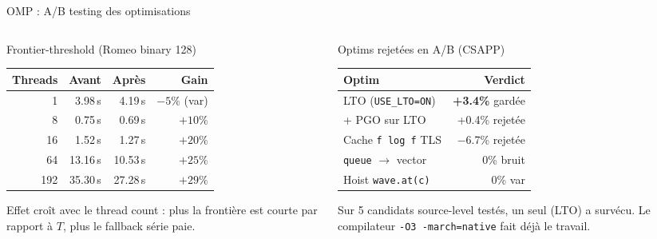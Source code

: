 \documentclass[aspectratio=169,11pt]{beamer}
\begin{document}
\begin{frame}{OMP : A/B testing des optimisations}
\begin{columns}[T]
\begin{column}{0.50\textwidth}
\begin{block}{Frontier-threshold (Romeo binary 128)}
\centering
\footnotesize
\begin{tabular}{rrrr}
\toprule
\textbf{Threads} & \textbf{Avant} & \textbf{Après} & \textbf{Gain} \\
\midrule
1   & 3.98\,s  & 4.19\,s  & $-5\%$ (var) \\
8   & 0.75\,s  & 0.69\,s  & $+10\%$ \\
16  & 1.52\,s  & 1.27\,s  & $+20\%$ \\
64  & 13.16\,s & 10.53\,s & $+25\%$ \\
192 & 35.30\,s & 27.28\,s & $+29\%$ \\
\bottomrule
\end{tabular}
\end{block}

\vspace{0.2cm}
{\footnotesize Effet croît avec le thread count : plus la frontière est courte par rapport à $T$, plus le fallback série paie.}
\end{column}
\begin{column}{0.46\textwidth}
\begin{block}{Optims rejetées en A/B (CSAPP)}
\centering
\footnotesize
\begin{tabular}{lr}
\toprule
\textbf{Optim} & \textbf{Verdict} \\
\midrule
LTO (\texttt{USE\_LTO=ON}) & \textbf{+3.4\%} gardée \\
+ PGO sur LTO & +0.4\% rejetée \\
Cache \texttt{f log f} TLS & $-$6.7\% rejetée \\
\texttt{queue} $\to$ vector & 0\% bruit \\
Hoist \texttt{wave.at(c)} & 0\% var \\
\bottomrule
\end{tabular}
\end{block}

\vspace{0.2cm}
{\footnotesize Sur 5 candidats source-level testés, un seul (LTO) a survécu. Le compilateur \texttt{-O3 -march=native} fait déjà le travail.}
\end{column}
\end{columns}
\end{frame}
\end{document}
